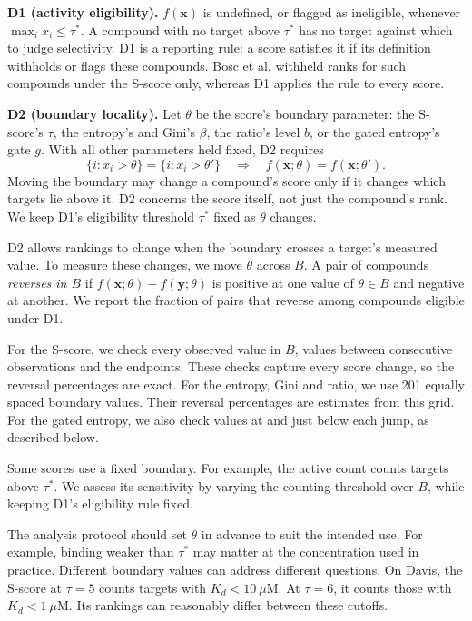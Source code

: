 \textbf{D1 (activity eligibility).} $f(\mathbf{x})$ is undefined, or flagged as
ineligible, whenever $\max_i x_i \leq \tau^*$. A compound with no target
above $\tau^*$ has no target against which to judge selectivity. D1 is a
reporting rule: a score satisfies it if its definition withholds or flags
these compounds. Bosc et
al.\cite{Bosc2017} withheld ranks for such compounds under the S-score only,
whereas D1 applies the rule to every score.

\textbf{D2 (boundary locality).} Let $\theta$ be the score's boundary
parameter: the S-score's $\tau$, the entropy's and Gini's $\beta$, the ratio's
level $b$, or the gated entropy's gate $g$. With all other parameters held
fixed, D2 requires
\[
  \{i : x_i > \theta\} = \{i : x_i > \theta'\}
  \quad\Longrightarrow\quad
  f(\mathbf{x}; \theta) = f(\mathbf{x}; \theta').
\]
Moving the boundary may change a compound's score only if it changes which
targets lie above it. D2 concerns the score itself, not just the compound's
rank. We keep D1's eligibility threshold $\tau^*$ fixed as $\theta$ changes.

D2 allows rankings to change when the boundary crosses a target's measured
value. To measure these changes, we move $\theta$ across $B$. A pair of
compounds \emph{reverses in $B$} if
$f(\mathbf{x}; \theta) - f(\mathbf{y}; \theta)$ is positive at one value of
$\theta \in B$ and negative at another. We report the fraction of pairs that
reverse among compounds eligible under D1.

For the S-score, we check every observed value in $B$, values between
consecutive observations and the endpoints. These checks capture every score
change, so the reversal percentages are exact. For the entropy, Gini and
ratio, we use 201 equally spaced boundary values. Their reversal percentages
are estimates from this grid. For the gated entropy, we also check values at
and just below each jump, as described below.

Some scores use a fixed boundary. For example, the active count counts
targets above $\tau^*$. We assess its sensitivity by varying the counting
threshold over $B$, while keeping D1's eligibility rule fixed.

The analysis protocol should set $\theta$ in advance to suit the intended
use. For example, binding weaker than $\tau^*$ may matter at the concentration
used in practice. Different boundary values can address different questions.
On Davis, the S-score at $\tau = 5$ counts targets with $K_d < 10~\mu$M.
At $\tau = 6$, it counts those with $K_d < 1~\mu$M. Its rankings can
reasonably differ between these cutoffs.

